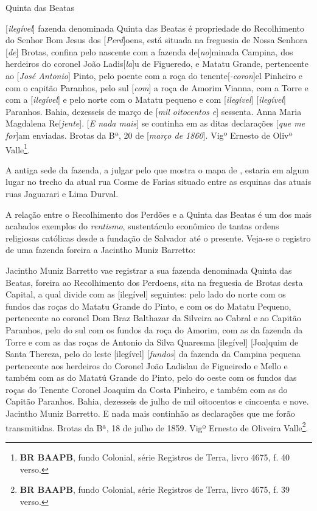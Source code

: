 \begin{citacao}
Quinta das Beatas

[\textit{ilegível}] fazenda denominada Quinta das Beatas é propriedade do Recolhimento do Senhor Bom Jesus dos [\textit{Perd}]oens, está situada na freguesia de Nossa Senhora [\textit{de}] Brotas, confina pelo nascente com a fazenda de[\textit{no}]minada Campina, dos herdeiros do coronel João Ladis[\textit{la}]u de Figueredo, e Matatu Grande, pertencente ao [\textit{José Antonio}] Pinto, pelo poente com a roça do tenente[\textit{-coron}]el Pinheiro e com o capitão Paranhos, pelo sul [\textit{com}] a roça de Amorim Vianna, com a Torre e com a [\textit{ilegível}] e pelo norte com o Matatu pequeno e com [\textit{ilegível}] [\textit{ilegível}] Paranhos. Bahia, dezesseis de março de [\textit{mil oitocentos e}] sessenta. Anna Maria Magdalena Re[\textit{jente}]. [\textit{E nada mais}] se continha em as ditas declarações [\textit{que me for}]am enviadas. Brotas da Bª, 20 de [\textit{março de 1860}]. Vigº Ernesto de Olivª Valle\footnote{\textbf{BR BAAPB}, fundo Colonial, série Registros de Terra, livro 4675, f. 40 verso.}.
\end{citacao}

A antiga sede da fazenda, a julgar pelo que mostra o mapa de , estaria em algum lugar no trecho da atual rua Cosme de Farias situado entre as esquinas das atuais ruas Jaguarari e Lima Durval.

A relação entre o Recolhimento dos Perdões e a Quinta das Beatas é um dos mais acabados exemplos do \textit{rentismo}, sustentáculo econômico de tantas ordens religiosas católicas desde a fundação de Salvador até o presente. Veja-se o registro de uma fazenda foreira a Jacintho Muniz Barretto:

\begin{citacao}
Jacintho Muniz Barretto vae registrar a sua fazenda denominada Quinta das Beatas, foreira ao Recolhimento dos Perdoens, sita na freguesia de Brotas desta Capital, a qual divide com as [ilegível] seguintes: pelo lado do norte com os fundos das roças do Matatu Grande do Pinto, e com os do Matatu Pequeno, pertencente ao coronel Dom Braz Balthazar da Silveira ao Cabral e ao Capitão Paranhos, pelo do sul com os fundos da roça do Amorim, com as da fazenda da Torre e com as das roças de Antonio da Silva Quaresma [ilegível] [Joa]quim de Santa Thereza, pelo do leste [ilegível] [\textit{fundos}] da fazenda da Campina pequena pertencente aos herdeiros do Coronel João Ladislau de Figueiredo e Mello e também com as do Matatú Grande do Pinto, pelo do oeste com os fundos das roças do Tenente Coronel Joaquim da Costa Pinheiro, e também com as do Capitão Paranhos. Bahia, dezesseis de julho de mil oitocentos e cincoenta e nove. Jacintho Muniz Barretto. E nada mais continhão as declarações que me forão transmitidas. Brotas da Bª, 18 de julho de 1859. Vigº Ernesto de Oliveira Valle\footnote{\textbf{BR BAAPB}, fundo Colonial, série Registros de Terra, livro 4675, f. 39 verso.}.
\end{citacao}

